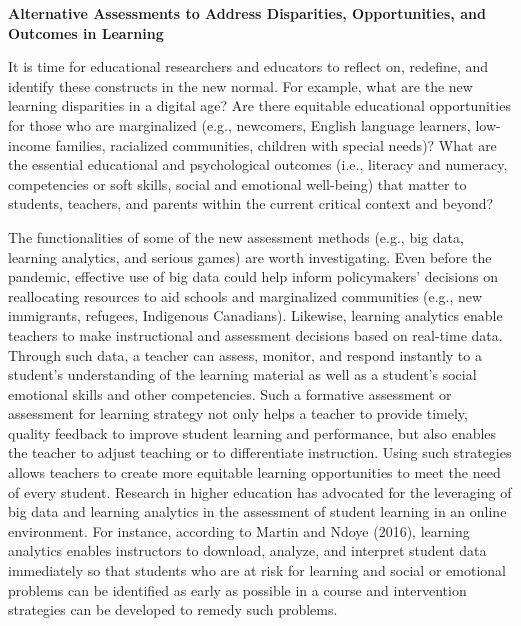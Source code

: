 \documentclass[
]{book}
\begin{document}
\textbf{Alternative Assessments to Address Disparities, Opportunities, and Outcomes in Learning}

It is time for educational researchers and educators to reflect on, redefine, and identify these constructs in the new normal. For example, what are the new learning disparities in a digital age? Are there equitable educational opportunities for those who are marginalized (e.g., newcomers, English language learners, low-income families, racialized communities, children with special needs)? What are the essential educational and psychological outcomes (i.e., literacy and numeracy, competencies or soft skills, social and emotional well-being) that matter to students, teachers, and parents within the current critical context and beyond?

The functionalities of some of the new assessment methods (e.g., big data, learning analytics, and serious games) are worth investigating. Even before the pandemic, effective use of big data could help inform policymakers' decisions on reallocating resources to aid schools and marginalized communities (e.g., new immigrants, refugees, Indigenous Canadians). Likewise, learning analytics enable teachers to make instructional and assessment decisions based on real-time data. Through such data, a teacher can assess, monitor, and respond instantly to a student's understanding of the learning material as well as a student's social emotional skills and other competencies. Such a formative assessment or assessment for learning strategy not only helps a teacher to provide timely, quality feedback to improve student learning and performance, but also enables the teacher to adjust teaching or to differentiate instruction. Using such strategies allows teachers to create more equitable learning opportunities to meet the need of every student. Research in higher education has advocated for the leveraging of big data and learning analytics in the assessment of student learning in an online environment. For instance, according to Martin and Ndoye (2016), learning analytics enables instructors to download, analyze, and interpret student data immediately so that students who are at risk for learning and social or emotional problems can be identified as early as possible in a course and intervention strategies can be developed to remedy such problems.
\end{document}
